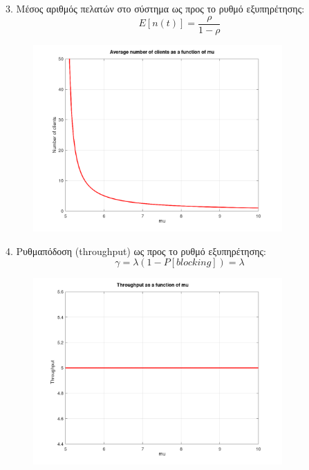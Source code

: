 \documentclass[a4paper]{article}
\begin{document}
\begin{minipage}{\textwidth}
	3. Μέσος αριθμός πελατών στο σύστημα ως προς το ρυθμό εξυπηρέτησης:
	\[
		E[n(t)] = \frac{ρ}{1-ρ}
	\]
	\begin{figure}[H]
		\begin{center}
			\includegraphics[width=0.85\textwidth]{files/2b3.png}
		\end{center}
	\end{figure}	
	
\end{minipage}
	
\begin{minipage}{\textwidth}
	4. Ρυθμαπόδοση (throughput) ως προς το ρυθμό εξυπηρέτησης:
	\[
		γ = λ \left(1-P[blocking]\right) = λ 
	\]
	\begin{figure}[H]
		\begin{center}
			\includegraphics[width=0.85\textwidth]{files/2b4.png}
		\end{center}
	\end{figure}
\end{minipage}
\end{document}
